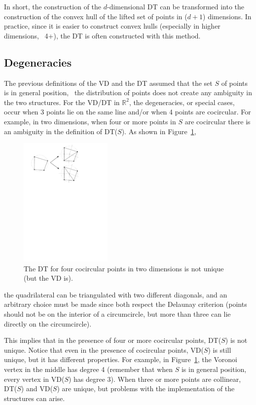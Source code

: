 %

In short, the construction of the $d$-dimensional DT can be transformed into the construction of the convex hull of the lifted set of points in ($d+1$) dimensions.
In practice, since it is easier to construct convex hulls (especially in higher dimensions, \ie\ 4+), the DT is often constructed with this method.




%
\subsection{Degeneracies}
\label{sec:degeneracies}

The previous definitions of the VD and the DT assumed that the set $S$ of points is in general position, \ie\ the distribution of points does not create any ambiguity in the two structures. 
For the VD/DT in $\mathbb{R}^{2}$, the degeneracies, or special cases, occur when 3 points lie on the same line and/or when 4 points are cocircular. 
For example, in two dimensions, when four or more points in $S$ are cocircular there is an ambiguity in the definition of DT($S$). 
As shown in Figure~\ref{fig:degeneracies},
\begin{figure}
  \centering
  \includegraphics[width=0.4\textwidth]{figs/degeneracies}
  \caption{The DT for four cocircular points in two dimensions is not unique (but the VD is).}
\label{fig:degeneracies}
\end{figure}
the quadrilateral can be triangulated with two different diagonals, and an arbitrary choice must be made since both respect the Delaunay criterion (points should not be on the interior of a circumcircle, but more than three can lie directly on the circumcircle).

This implies that in the presence of four or more cocircular points, DT($S$) is not unique. 
Notice that even in the presence of cocircular points, VD($S$) is still unique, but it has different properties. 
For example, in Figure~\ref{fig:degeneracies}, the Voronoi vertex in the middle has degree 4 (remember that when $S$ is in general position, every vertex in VD($S$) has degree 3). 
When three or more points are collinear, DT($S$) and VD($S$) are unique, but problems with the implementation of the structures can arise.


